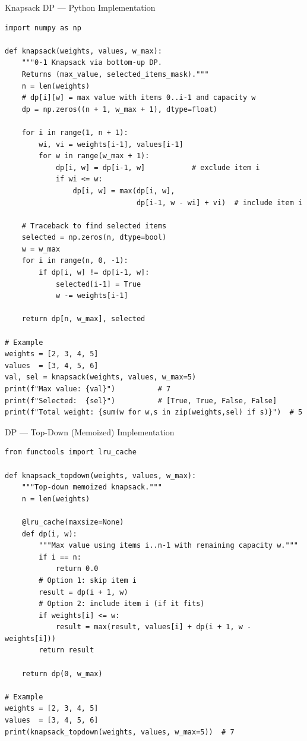 \documentclass[aspectratio=169,10pt]{beamer}
\begin{document}
\begin{frame}[fragile]{Knapsack DP --- Python Implementation}
\begin{lstlisting}[style=pystyle, caption={0-1 Knapsack via dynamic programming (Python)}]
import numpy as np

def knapsack(weights, values, w_max):
    """0-1 Knapsack via bottom-up DP.
    Returns (max_value, selected_items_mask)."""
    n = len(weights)
    # dp[i][w] = max value with items 0..i-1 and capacity w
    dp = np.zeros((n + 1, w_max + 1), dtype=float)

    for i in range(1, n + 1):
        wi, vi = weights[i-1], values[i-1]
        for w in range(w_max + 1):
            dp[i, w] = dp[i-1, w]           # exclude item i
            if wi <= w:
                dp[i, w] = max(dp[i, w],
                               dp[i-1, w - wi] + vi)  # include item i

    # Traceback to find selected items
    selected = np.zeros(n, dtype=bool)
    w = w_max
    for i in range(n, 0, -1):
        if dp[i, w] != dp[i-1, w]:
            selected[i-1] = True
            w -= weights[i-1]

    return dp[n, w_max], selected

# Example
weights = [2, 3, 4, 5]
values  = [3, 4, 5, 6]
val, sel = knapsack(weights, values, w_max=5)
print(f"Max value: {val}")          # 7
print(f"Selected:  {sel}")          # [True, True, False, False]
print(f"Total weight: {sum(w for w,s in zip(weights,sel) if s)}")  # 5
\end{lstlisting}
\end{frame}

\begin{frame}[fragile]{DP --- Top-Down (Memoized) Implementation}
\begin{lstlisting}[style=pystyle, caption={Top-down memoized knapsack (Python)}]
from functools import lru_cache

def knapsack_topdown(weights, values, w_max):
    """Top-down memoized knapsack."""
    n = len(weights)

    @lru_cache(maxsize=None)
    def dp(i, w):
        """Max value using items i..n-1 with remaining capacity w."""
        if i == n:
            return 0.0
        # Option 1: skip item i
        result = dp(i + 1, w)
        # Option 2: include item i (if it fits)
        if weights[i] <= w:
            result = max(result, values[i] + dp(i + 1, w - weights[i]))
        return result

    return dp(0, w_max)

# Example
weights = [2, 3, 4, 5]
values  = [3, 4, 5, 6]
print(knapsack_topdown(weights, values, w_max=5))  # 7
\end{lstlisting}
\end{frame}
\end{document}
